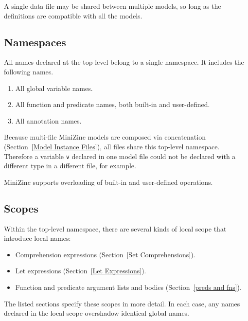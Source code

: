 \documentclass[10pt]{scrartcl}
\begin{document}
A single data file may be shared between multiple models, so long as the
definitions are compatible with all the models.

\subsection{Namespaces}
     \label{Namespaces}
All names declared at the top-level belong to a single namespace.
It includes the following names.
\begin{enumerate}
\item All global variable names.
\item All function and predicate names, both built-in and user-defined.
\item All annotation names.
\end{enumerate}

Because multi-file MiniZinc models are composed via
concatenation (Section~\ref{Model Instance Files}), all files share
this top-level namespace.  Therefore a variable \texttt{v} declared in one
model file could not be declared with a different type in a different file,
for example.

MiniZinc supports overloading of built-in and user-defined operations.


\subsection{Scopes}
     \label{Scopes}
Within the top-level namespace, there are several kinds of local scope that
introduce local names:
\begin{itemize}
\item Comprehension expressions (Section~\ref{Set Comprehensions}).
\item Let expressions (Section~\ref{Let Expressions}).
\item Function and predicate argument lists and bodies (Section~\ref{preds
      and fns}).
\end{itemize}
The listed sections specify these scopes in more detail.  In each case, any
names declared in the local scope overshadow identical global names.
\end{document}
